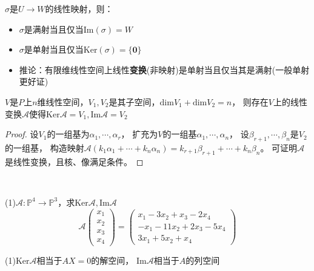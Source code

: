 \begin{theorem}[核像与单射、满射]
  $\sigma$是$U \rightarrow W$的线性映射，则：
  \begin{itemize}
  \item $\sigma$是满射当且仅当$\mathrm{Im}(\sigma) = W$
  \item $\sigma$是单射当且仅当$\mathrm{Ker}(\sigma) = \{\mathbf{0}\}$
  \item 推论：有限维线性空间上线性\textbf{变换}(非映射)是单射当且仅当其是满射(一般单射更好证)
  \end{itemize}
\end{theorem}

\begin{theorem}[核、像任意性]
  $V$是$P$上$n$维线性空间，$V_1,V_2$是其子空间，$\mathrm{dim}V_1 + \mathrm{dim}V_2 = n$，
  则存在$V$上的线性变换$\mathcal{A}$使得$\mathrm{Ker}\mathcal{A} = V_1, \mathrm{Im}\mathcal{A} = V_2$
\end{theorem}

\begin{proof}
  设$V_1$的一组基为$\alpha_1 ,\cdots, \alpha_r$，
  扩充为$V$的一组基$\alpha_1,\cdots,\alpha_n$，
  设$\beta_{r+1},\cdots,\beta_n$是$V_2$的一组基，
  构造映射$\mathcal{A}(k_1 \alpha_1 + \cdots + k_n \alpha_n) = k_{r+1} \beta_{r+1} + \cdots + k_n\beta_n$。
  可证明$\mathcal{A}$是线性变换，且核、像满足条件。
\end{proof}

~

\begin{exercise}[计算核与像]
  (1)$\mathcal{A}: \mathbb{P}^4 \rightarrow \mathbb{P}^3$，求$\mathrm{Ker}\mathcal{A}, \mathrm{Im}\mathcal{A}$
  \begin{equation*}
    \mathcal{A} \left(
      \begin{array}{c}
        x_1\\
        x_2\\
        x_3\\
        x_4
      \end{array}
    \right) = \left(
      \begin{array}{c}
        x_1 - 3x_2 + x_3 - 2x_4\\
        -x_1 - 11x_2 + 2x_3 - 5x_4\\
        3x_1 + 5x_2 + x_4
      \end{array}
    \right)
  \end{equation*}
\end{exercise}

\begin{solution}
  (1)$\mathrm{Ker}\mathcal{A}$相当于$AX = 0$的解空间，
  $\mathrm{Im}\mathcal{A}$相当于$A$的列空间
\end{solution}


